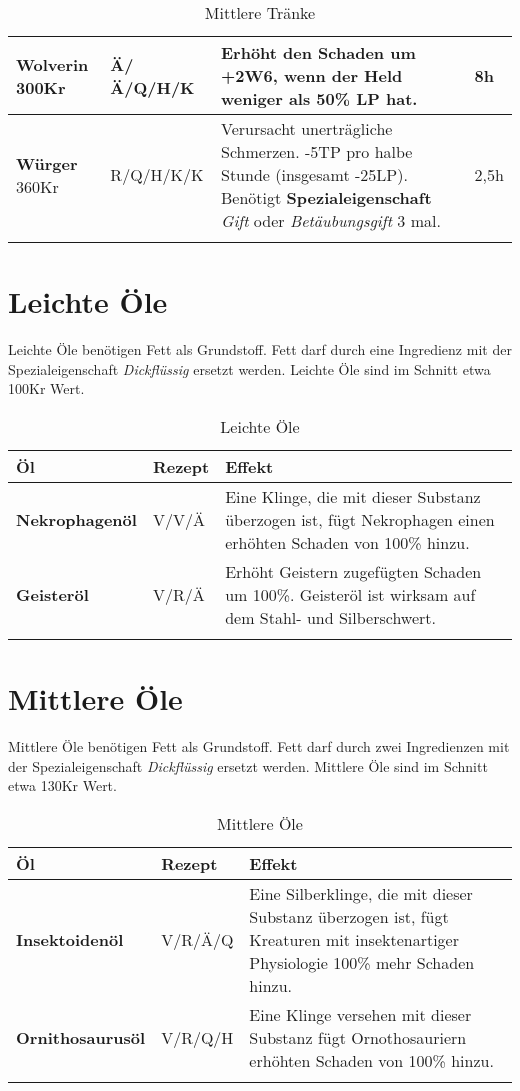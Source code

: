 \begin{longtable}{|p{3cm}|p{}|p{8cm}|p{}|}
\textbf{Wolverin} \newline 300Kr & Ä/Ä/Q/H/K & Erhöht den Schaden um +2W6, wenn der Held weniger als 50\% LP hat. & 8h \\ \hline

\textbf{Würger} \newline 360Kr & R/Q/H/K/K & Verursacht unerträgliche Schmerzen. -5TP pro halbe Stunde (insgesamt -25LP). Benötigt \textbf{Spezialeigenschaft} \textit{Gift} oder \textit{Betäubungsgift} 3 mal. & 2,5h \\ \hline

\caption{Mittlere Tränke}
\label{tab:mittlere_traenke}
\end{longtable}


\section{Leichte Öle}
Leichte Öle benötigen Fett als Grundstoff. Fett darf durch eine Ingredienz mit der Spezialeigenschaft \textit{Dickflüssig} ersetzt werden. Leichte Öle sind im Schnitt etwa 100Kr Wert.

\begin{longtable}{|p{4cm}|p{}|p{9cm}|}
\hline
\textbf{Öl} & \textbf{Rezept} & \textbf{Effekt} \\ \hline

\textbf{Nekrophagenöl} & V/V/Ä & Eine Klinge, die mit dieser Substanz überzogen ist, fügt Nekrophagen einen erhöhten Schaden von 100\% hinzu. \\ \hline

\textbf{Geisteröl} & V/R/Ä & Erhöht Geistern zugefügten Schaden um 100\%. Geisteröl ist wirksam auf dem Stahl- und Silberschwert.  \\ \hline

\caption{Leichte Öle}
\label{tab:leichte_oele}
\end{longtable}


\section{Mittlere Öle}
Mittlere Öle benötigen Fett als Grundstoff. Fett darf durch zwei Ingredienzen mit der Spezialeigenschaft \textit{Dickflüssig} ersetzt werden. Mittlere Öle sind im Schnitt etwa 130Kr Wert.

\begin{longtable}{|p{4cm}|p{}|p{9cm}|}
\hline
\textbf{Öl} & \textbf{Rezept} & \textbf{Effekt} \\ \hline

\textbf{Insektoidenöl} & V/R/Ä/Q & Eine Silberklinge, die mit dieser Substanz überzogen ist, fügt Kreaturen mit insektenartiger Physiologie 100\% mehr Schaden hinzu. \\ \hline

\textbf{Ornithosaurusöl} & V/R/Q/H & Eine Klinge versehen mit dieser Substanz fügt Ornothosauriern erhöhten Schaden von 100\% hinzu.  \\ \hline

\caption{Mittlere Öle}
\label{tab:mittlere_oele}
\end{longtable}


